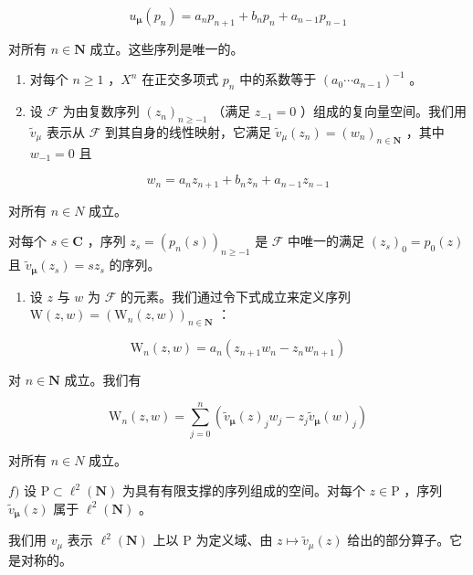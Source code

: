 \[
u _ {\pmb {\mu}} (p _ {n}) = a _ {n} p _ {n + 1} + b _ {n} p _ {n} + a _ {n - 1} p _ {n - 1}
\]

对所有 \(n \in \mathbf{N}\) 成立。这些序列是唯一的。

\begin{enumerate}
\def\labelenumi{\alph{enumi})}
\setcounter{enumi}{2}
\item
  对每个 \(n \geqslant 1\) ，\(X^{n}\) 在正交多项式 \(p_{n}\) 中的系数等于 \((a_{0} \cdots a_{n-1})^{-1}\) 。
\item
  设 \(\mathcal{F}\) 为由复数序列 \((z_{n})_{n\geqslant -1}\) （满足 \(z_{-1} = 0\) ）组成的复向量空间。我们用 \(\widetilde{v}_{\mu}\) 表示从 \(\mathcal{F}\) 到其自身的线性映射，它满足 \(\widetilde{v}_{\mu}(z_n) = (w_n)_{n\in \mathbf{N}}\) ，其中 \(w_{-1} = 0\) 且
\end{enumerate}

\[
w _ {n} = a _ {n} z _ {n + 1} + b _ {n} z _ {n} + a _ {n - 1} z _ {n - 1}
\]

对所有 \(n \in N\) 成立。

对每个 \(s \in \mathbf{C}\) ，序列 \(z_s = (p_n(s))_{n \geqslant -1}\) 是 \(\mathcal{F}\) 中唯一的满足 \((z_s)_0 = p_0(z)\) 且 \(\widetilde{v}_{\boldsymbol{\mu}}(z_s) = sz_s\) 的序列。

\begin{enumerate}
\def\labelenumi{\alph{enumi})}
\setcounter{enumi}{4}
\tightlist
\item
  设 \(z\) 与 \(w\) 为 \(\mathcal{F}\) 的元素。我们通过令下式成立来定义序列 \(\mathrm{W}(z,w) = (\mathrm{W}_n(z,w))_{n\in \mathbf{N}}\) ：
\end{enumerate}

\[
\mathrm{W} _ {n} (z, w) = a _ {n} (z _ {n + 1} w _ {n} - z _ {n} w _ {n + 1})
\]

对 \(n\in \mathbf{N}\) 成立。我们有

\[
\mathrm{W} _ {n} (z, w) = \sum_ {j = 0} ^ {n} (\widetilde {v} _ {\boldsymbol {\mu}} (z) _ {j} w _ {j} - z _ {j} \widetilde {v} _ {\boldsymbol {\mu}} (w) _ {j})
\]

对所有 \(n \in N\) 成立。

\(f)\) 设 \(\mathrm{P} \subset \ell^2(\mathbf{N})\) 为具有有限支撑的序列组成的空间。对每个 \(z \in \mathrm{P}\) ，序列 \(\widetilde{v}_{\boldsymbol{\mu}}(z)\) 属于 \(\ell^2(\mathbf{N})\) 。

我们用 \(v_{\mu}\) 表示 \(\ell^2(\mathbf{N})\) 上以 P 为定义域、由 \(z \mapsto \widetilde{v}_{\mu}(z)\) 给出的部分算子。它是对称的。

